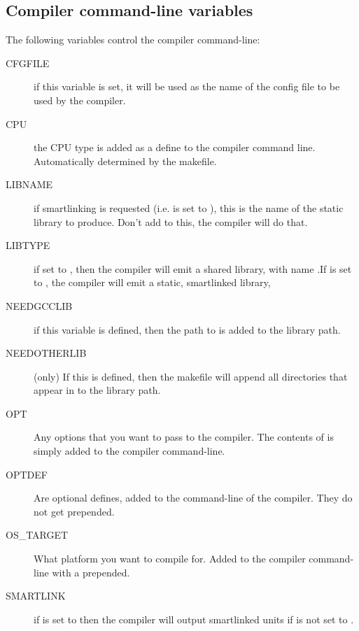 \documentclass{report}
\begin{document}
\subsection{Compiler command-line variables}

The following variables control the compiler command-line:
\begin{description}
\item[CFGFILE] if this variable is set, it will be used as the name of the
config file to be used by the compiler.

\item[CPU] the CPU type is added as a define to the compiler command line.
Automatically determined by the makefile.

\item[LIBNAME] if smartlinking is requested (i.e.  is set to
), this is the name of the static library to produce. Don't add
 to this, the compiler will do that.

\item[LIBTYPE] if set to , then the compiler will emit a shared
library, with name .If  is set to ,
the compiler will emit a static, smartlinked library, 

\item[NEEDGCCLIB] if this variable is defined, then the path to 
is added to the library path.

\item[NEEDOTHERLIB] (\linux only) If this is defined, then the makefile will 
append all directories that appear in  to the library path.


\item[OPT] Any options that you want to pass to the compiler. The contents
of  is simply added to the compiler command-line.

\item[OPTDEF] Are optional defines, added to the command-line of the
compiler. They do not get  prepended.

\item[OS\_TARGET] What platform you want to compile for. Added to the
compiler command-line with a  prepended.

\item[SMARTLINK] if  is set to  then the compiler
will output smartlinked units if  is not set to .

\end{description}
\end{document}
